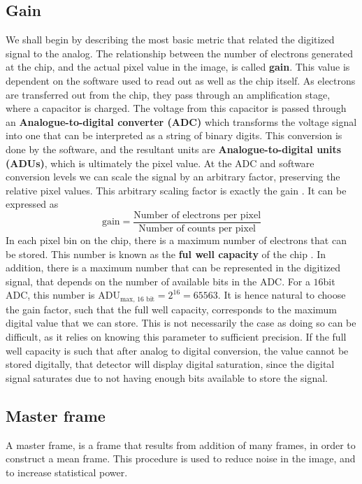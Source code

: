 \documentclass[../main.tex]{subfiles}
\begin{document}
	\subsection{Gain}
	We shall begin by describing the most basic metric that related the digitized signal to the analog. The relationship between the number of electrons generated at the chip, and the actual pixel value in the image, is called \textbf{gain}\cite{handbookofccdastronomy, CCDdatareductionguide}. This value is dependent on the software used to read out as well as the chip itself. As electrons are transferred out from the chip, they pass through an amplification stage, where a capacitor is charged. The voltage from this capacitor is passed through an \textbf{Analogue-to-digital converter (ADC)} which transforms the voltage signal into one that can be interpreted as a string of binary digits. This conversion is done by the software, and the resultant units are \textbf{Analogue-to-digital units (ADUs)}, which is ultimately the pixel value\cite{handbookofccdastronomy}. At the ADC and software conversion levels we can scale the signal by an arbitrary factor, preserving the relative pixel values. This arbitrary scaling factor is exactly the gain \cite{handbookofccdastronomy, CCDdatareductionguide}. It can be expressed as
	\begin{equation}
		\text{gain} = \frac{\text{Number of electrons per pixel}}{\text{Number of counts per pixel}}
	\end{equation} 
	In each pixel bin on the chip, there is a maximum number of electrons that can be stored. This number is known as the \textbf{ful well capacity} of the chip \cite{handbookofccdastronomy}. In addition, there is a maximum number that can be represented in the digitized signal, that depends on the number of available bits in the ADC. For a $16$bit ADC, this number is $\text{ADU}_{\text{max, 16 bit}} = 2^{16} = 65563$. It is hence natural to choose the gain factor, such that the full well capacity, corresponds to the maximum digital value that we can store. This is not necessarily the case as doing so can be difficult, as it relies on knowing this parameter to sufficient precision. If the full well capacity is such that after analog to digital conversion, the value cannot be stored digitally, that detector will display digital saturation, since the digital signal saturates due to not having enough bits available to store the signal.
	
	\subsection{Master frame}
	A master frame, is a frame that results from addition of many frames, in order to construct a mean frame. This procedure is used to reduce noise in the image, and to increase statistical power.
	
\end{document}
